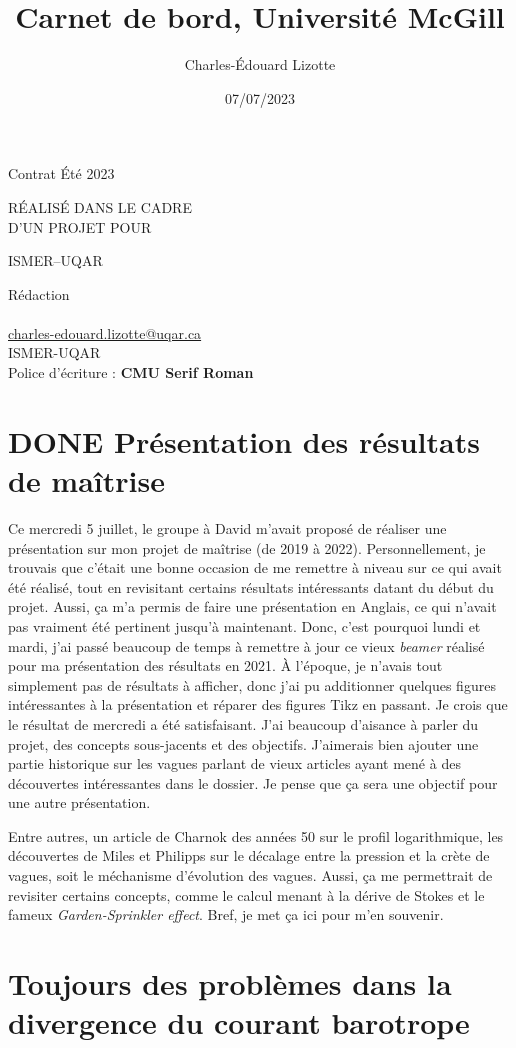 \documentclass[10pt]{report}
\author{Charles-Édouard Lizotte}
\date{07/07/2023}
\title{Carnet de bord, Université McGill}
\makeatletter
\numberwithin{equation}{section}
\newcommand{\mytitlepage}{
\begin{titlepage}
\begin{center}
{\Huge Contrat Été 2023 \par}
\vspace{2cm}
{\Huge \MakeUppercase{\thetitle} \par}
\vspace{2cm}
RÉALISÉ DANS LE CADRE\\ D'UN PROJET POUR \par
\vspace{2cm}
{\Huge ISMER--UQAR \par}
\vspace{2cm}
{\thedate}
\end{center}
\vfill
Rédaction \\
{\theauthor}\\
\url{charles-edouard.lizotte@uqar.ca}\\
ISMER-UQAR\\
Police d'écriture : \textbf{CMU Serif Roman}
\end{titlepage}
}
\makeatother
\begin{document}
\mytitlepage
\tableofcontents\newpage



\section{{\bfseries\sffamily DONE} Présentation des résultats de maîtrise}
\label{sec:orgd2a40ff}
Ce mercredi 5 juillet, le groupe à David m'avait proposé de réaliser une présentation sur mon projet de maîtrise (de 2019 à 2022).
Personnellement, je trouvais que c'était une bonne occasion de me remettre à niveau sur ce qui avait été réalisé, tout en revisitant certains résultats intéressants datant du début du projet.
Aussi, ça m'a permis de faire une présentation en Anglais, ce qui n'avait pas vraiment été pertinent jusqu'à maintenant.
Donc, c'est pourquoi lundi et mardi, j'ai passé beaucoup de temps à remettre à jour ce vieux \emph{beamer} réalisé pour ma présentation des résultats en 2021.
À l'époque, je n'avais tout simplement pas de résultats à afficher, donc j'ai pu additionner quelques figures intéressantes à la présentation et réparer des figures Tikz en passant.
Je crois que le résultat de mercredi a été satisfaisant.
J'ai beaucoup d'aisance à parler du projet, des concepts sous-jacents et des objectifs.
J'aimerais bien ajouter une partie historique sur les vagues parlant de vieux articles ayant mené à des découvertes intéressantes dans le dossier.
Je pense que ça sera une objectif pour une autre présentation.\bigskip

Entre autres, un article de Charnok des années 50 sur le profil logarithmique, les découvertes de Miles et Philipps sur le décalage entre la pression et la crète de vagues, soit le méchanisme d'évolution des vagues.
Aussi, ça me permettrait de revisiter certains concepts, comme le calcul menant à la dérive de Stokes et le fameux \emph{Garden-Sprinkler effect}.
Bref, je met ça ici pour m'en souvenir.

\section{Toujours des problèmes dans la divergence du courant barotrope}
\label{sec:org1c0fe91}
\end{document}
